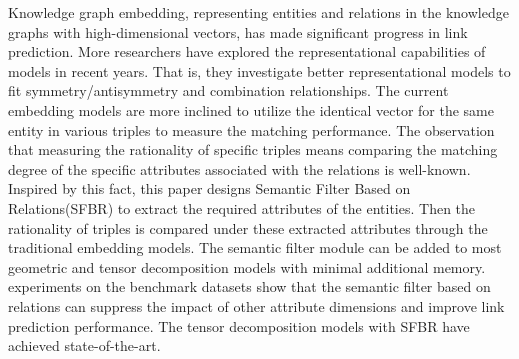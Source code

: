 Knowledge graph embedding, representing entities and relations in the knowledge graphs with high-dimensional vectors, has made significant progress in link prediction. More researchers have explored the representational capabilities of models in recent years. That is, they investigate better representational models to fit symmetry/antisymmetry and combination relationships. The current embedding models are more inclined to utilize the identical vector for the same entity in various triples to measure the matching performance. The observation that measuring the rationality of specific triples means comparing the matching degree of the specific attributes associated with the relations is well-known. Inspired by this fact, this paper designs Semantic Filter Based on Relations(SFBR) to extract the required attributes of the entities. Then the rationality of triples is compared under these extracted attributes through the traditional embedding models. The semantic filter module can be added to most geometric and tensor decomposition models with minimal additional memory. experiments on the benchmark datasets show that the semantic filter based on relations can suppress the impact of other attribute dimensions and improve link prediction performance. The tensor decomposition models with SFBR have achieved state-of-the-art.
